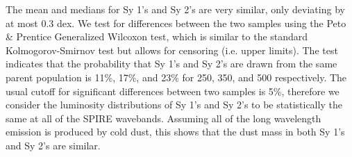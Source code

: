 The mean and medians for Sy 1's and Sy 2's are very similar, only deviating by at most 0.3 dex. We test for differences between the two samples using the Peto \& Prentice Generalized Wilcoxon test, which is similar to the standard Kolmogorov-Smirnov test but allows for censoring (i.e. upper limits). The test indicates that the probability that Sy 1's and Sy 2's are drawn from the same parent population is 11\%, 17\%, and 23\% for 250, 350, and 500 \um{} respectively. The usual cutoff for significant differences between two samples is 5\%, therefore we consider the luminosity distributions of Sy 1's and Sy 2's to be statistically the same at all of the SPIRE wavebands. Assuming all of the long wavelength emission is produced by cold dust, this shows that the dust mass in both Sy 1's and Sy 2's are similar. 
  
  